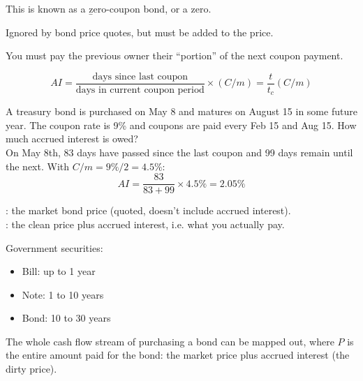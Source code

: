 This is known as a \b{zero-coupon bond}, or a zero.

Ignored by bond price quotes, but must be added to the price.

\begin{center}
\end{center}

You must pay the previous owner their ``portion'' of the next coupon payment.

\[\boxed{AI = \frac{\text{days since last coupon}}{\text{days in current coupon period}} \times (C/m) = \frac{t}{t_c}(C/m)}\]

\begin{example}
    A treasury bond is purchased on May 8 and matures on August 15 in some future year. The coupon rate is 9\% and coupons are paid every Feb 15 and Aug 15. How much accrued interest is owed?
    \\On May 8th, 83 days have passed since the last coupon and 99 days remain until the next. With $C/m = 9\%/2 = 4.5\%$:
    \[AI = \frac{83}{83+99}\times 4.5\% = 2.05\%\]
\end{example}

\begin{definition}
    : the market bond price (quoted, doesn't include accrued interest).
    \\: the clean price plus accrued interest, i.e. what you actually pay.
\end{definition}

Government securities:
\begin{itemize}
    \item Bill: up to 1 year
    \item Note: 1 to 10 years
    \item Bond: 10 to 30 years
\end{itemize}

The whole cash flow stream of purchasing a bond can be mapped out, where $P$ is the entire amount paid for the bond: the market price plus accrued interest (the dirty price).

